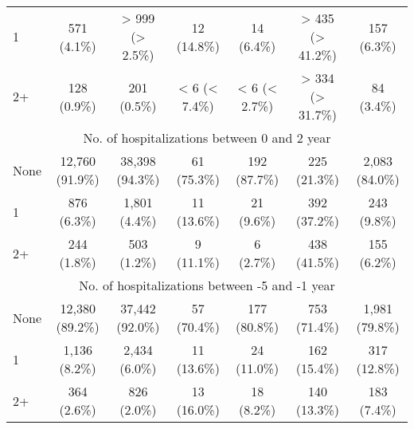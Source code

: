 \documentclass{article}
\begin{document}
\begin{table}[htbp]
\begin{longtable}{l*{6}{c}}
  1                                                     &           571 (4.1\%)           &         > 999 (> 2.5\%)         &           12 (14.8\%)           &            14 (6.4\%)           &         > 435 (> 41.2\%)        &           157 (6.3\%)           \\
  2+                                                    &           128 (0.9\%)           &           201 (0.5\%)           &          < 6 (< 7.4\%)          &          < 6 (< 2.7\%)          &         > 334 (> 31.7\%)        &            84 (3.4\%)           \\
\multicolumn{7}{c}{No. of hospitalizations between 0 and 2 year            }\\
  None                                                  &         12,760 (91.9\%)         &         38,398 (94.3\%)         &           61 (75.3\%)           &           192 (87.7\%)          &           225 (21.3\%)          &          2,083 (84.0\%)         \\
  1                                                     &           876 (6.3\%)           &          1,801 (4.4\%)          &           11 (13.6\%)           &            21 (9.6\%)           &           392 (37.2\%)          &           243 (9.8\%)           \\
  2+                                                    &           244 (1.8\%)           &           503 (1.2\%)           &            9 (11.1\%)           &            6 (2.7\%)            &           438 (41.5\%)          &           155 (6.2\%)           \\
\multicolumn{7}{c}{No. of hospitalizations between -5 and -1 year          }\\
  None                                                  &         12,380 (89.2\%)         &         37,442 (92.0\%)         &           57 (70.4\%)           &           177 (80.8\%)          &           753 (71.4\%)          &          1,981 (79.8\%)         \\
  1                                                     &          1,136 (8.2\%)          &          2,434 (6.0\%)          &           11 (13.6\%)           &           24 (11.0\%)           &           162 (15.4\%)          &           317 (12.8\%)          \\
  2+                                                    &           364 (2.6\%)           &           826 (2.0\%)           &           13 (16.0\%)           &            18 (8.2\%)           &           140 (13.3\%)          &           183 (7.4\%)           \\

\end{longtable}
\end{table}
\end{document}
